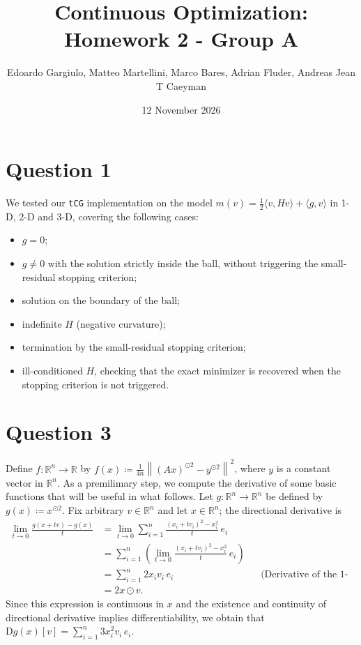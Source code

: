 \documentclass{article}
\title{Continuous Optimization: Homework 2 - Group A}
\author{Edoardo Gargiulo, Matteo Martellini, Marco Bares, Adrian Fluder, Andreas Jean T Caeyman}
\date{12 November 2026}
\theoremstyle{definition}
\theoremstyle{remark}
\newcommand{\R}{\mathbb{R}}
\newcommand \norm[1]{\left\lVert #1 \right\rVert}
\newcommand{\D}{\mathrm D}
\begin{document}
\maketitle

\section*{Question 1}
We tested our \texttt{tCG} implementation on the model $m(v)=\tfrac12\langle v,Hv\rangle+\langle g,v\rangle$ in 1-D, 2-D and 3-D, covering the following cases:
\begin{itemize}
    \item $g=0$;
    \item $g\neq 0$ with the solution strictly inside the ball, without triggering the small-residual stopping criterion;
    \item solution on the boundary of the ball;
    \item indefinite $H$ (negative curvature);
    \item termination by the small-residual stopping criterion;
    \item ill-conditioned $H$, checking that the exact minimizer is recovered when the stopping criterion is not triggered.
\end{itemize}

\section*{Question 3}
Define $f\colon \R^n\to \R$ by  $f(x)\coloneq \frac 1{4n}\norm{(Ax)^{\odot 2}-y^{\odot 2}}^2$, where $y$ is a constant vector in $\R^n$.
As a premilimary step, we compute the derivative of some basic functions that will be useful in what follows.
Let \(g:\mathbb{R}^n\to\mathbb{R}^n\) be defined by
\(
g(x) \coloneq x^{\odot 2}.
\)
Fix arbitrary $v\in \R^n$ and let $x\in \R^n$; the directional derivative is
\[
\begin{aligned}
\lim_{t\to 0}\frac{g(x+tv)-g(x)}{t} &= \lim_{t\to 0}\sum_{i=1}^n
\frac{(x_i+tv_i)^2-x_i^2}{t}\,e_i\\
&=\sum_{i=1}^n
\left(\lim_{t\to 0}
\frac{(x_i+tv_i)^2-x_i^2}{t}\,e_i\right)\\
&=\sum_{i=1}^n 2x_iv_i\,e_i &&\text{(Derivative of the 1-D square function)}\\
&= 2 x \odot v.
\end{aligned}
\]
Since this expression is continuous in $x$ and the existence and continuity of directional derivative implies differentiability, we obtain that
\(
\D g(x)[v]=\sum_{i=1}^n 3x_i^2v_i\,e_i
\).
\end{document}
